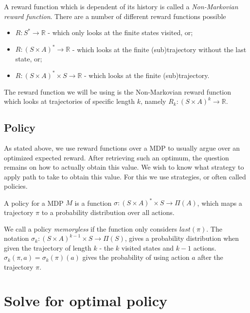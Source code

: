 
A reward function which is dependent of its history is called a \textit{Non-Markovian reward function}. There are a number of different reward functions possible
\begin{itemize}
	\item $R:S^*\to\mathbb{R}$ - which only looks at the finite states visited, or;
	\item $R:(S\times A)^*\to\mathbb{R}$ - which looks at the finite (sub)trajectory without the last state, or;
	\item $R:(S\times A)^*\times S\to \mathbb{R}$ - which looks at the finite (sub)trajectory.
\end{itemize}

The reward function we will be using is the Non-Markovian reward function which looks at trajectories of specific length $k$, namely $R_k:(S\times A)^k\to\mathbb{R}$. 



\subsection*{Policy}
As stated above, we use reward functions over a MDP to usually argue over an optimized expected reward. After retrieving such an optimum, the question remains on how to actually obtain this value. We wish to know what strategy to apply path to take to obtain this value. For this we use strategies, or often called policies. 

\begin{definition}
	A policy for a MDP $M$ is a function $\sigma:(S\times A)^*\times S \to \Pi(A)$, which maps a trajectory $\pi$ to a probability distribution over all actions. 
\end{definition}

We call a policy \textit{memoryless} if the function only considers $last(\pi)$. The notation $\sigma_k:(S\times A)^{k-1}\times S\to \Pi(S)$, gives a probability distribution when given the trajectory of length $k$ - the $k$ visited states and $k-1$ actions. $\sigma_k(\pi,a)=\sigma_k(\pi)(a)$ gives the probability of using action $a$ after the trajectory $\pi$.


\section{Solve for optimal policy}
